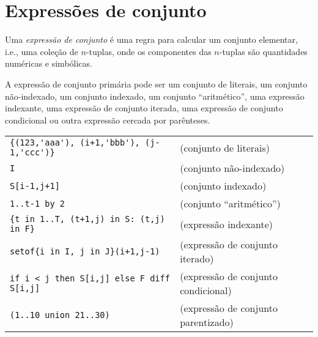 \documentclass[11pt, brazil]{report}
\def\para#1{\noindent{\bf#1}}
\begin{document}
\section{Expressões de conjunto}

Uma {\it expressão de conjunto} é uma regra para calcular um conjunto
elementar, i.e., uma coleção de $n$-tuplas, onde os componentes das
$n$-tuplas são quantidades numéricas e simbólicas.


A expressão de conjunto primária pode ser um conjunto de literais, um conjunto
não-indexado, um conjunto indexado, um conjunto ``aritmético'', uma expressão
indexante, uma expressão de \linebreak conjunto iterada, uma expressão de conjunto
condicional ou outra expressão cercada por \linebreak parênteses.

\para{Exemplos}

%

\noindent
\begin{tabular}{@{}ll@{}}
\verb|{(123,'aaa'), (i+1,'bbb'), (j-1,'ccc')}| &(conjunto de literais)\\
\verb|I| &(conjunto não-indexado)\\
\verb|S[i-1,j+1]| &(conjunto indexado)\\
\verb|1..t-1 by 2| &(conjunto ``aritmético'')\\
\verb|{t in 1..T, (t+1,j) in S: (t,j) in F}| &(expressão indexante)\\
\verb|setof{i in I, j in J}(i+1,j-1)| &(expressão de conjunto iterado)\\
\verb|if i < j then S[i,j] else F diff S[i,j]| &(expressão de conjunto
condicional)\\
\verb|(1..10 union 21..30)| &(expressão de conjunto parentizado)\\
\end{tabular}
\end{document}
